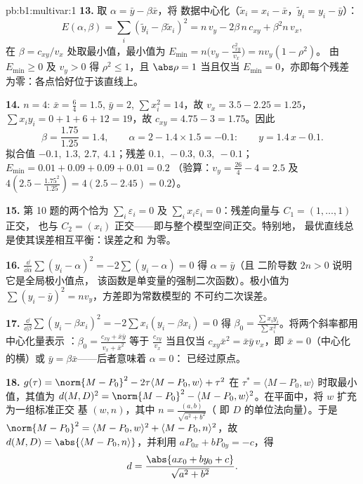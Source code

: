 \begin{solution}{pb:b1:multivar:1}
\textbf{13.} 取 $\alpha = \bar y - \beta\bar x$，将
数据中心化（$\tilde x_i = x_i - \bar x$，$\tilde y_i = y_i - \bar y$）：
\[
E(\alpha, \beta) = \sum_i(\tilde y_i - \beta\tilde x_i)^2
= n\,v_y - 2\beta\,n\,c_{xy} + \beta^2 n\,v_x ,
\]
在 $\beta = c_{xy}/v_x$ 处取最小值，最小值为 $E_{\min} =
n\bigl(v_y - \frac{c_{xy}^2}{v_x}\bigr) = n v_y(1 - \rho^2)$。
由 $E_{\min} \geq 0$ 及 $v_y > 0$ 得 $\rho^2 \leq 1$，且
$\abs\rho = 1$ 当且仅当 $E_{\min} = 0$，亦即每个残差
为零：各点恰好位于该直线上。

\textbf{14.} $n = 4$: $\bar x = \frac64 = 1.5$, $\bar y = 2$,
$\sum x_i^2 = 14$，故 $v_x = 3.5 - 2.25 = 1.25$，$\sum x_iy_i =
0 + 1 + 6 + 12 = 19$，故 $c_{xy} = 4.75 - 3 = 1.75$。因此
\[
\beta = \frac{1.75}{1.25} = 1.4,
\qquad
\alpha = 2 - 1.4\times1.5 = -0.1 :
\qquad y = 1.4\,x - 0.1 .
\]
拟合值 $-0.1,\ 1.3,\ 2.7,\ 4.1$；残差 $0.1,\ -0.3,\
0.3,\ -0.1$；$E_{\min} = 0.01 + 0.09 + 0.09 + 0.01 = 0.2$
（验算：$v_y = \frac{26}4 - 4 = 2.5$ 及 $4(2.5 -
\frac{1.75^2}{1.25}) = 4(2.5 - 2.45) = 0.2$）。

\textbf{15.} 第 10 题的两个恰为
$\sum_i\varepsilon_i = 0$ 及 $\sum_i x_i\varepsilon_i =
0$：残差向量与 $C_1 = (1, \dots, 1)$ 正交，
也与 $C_2 = (x_i)$ 正交——即与整个模型空间正交。特别地，
最优直线总是使其误差相互平衡：误差之和
为零。

\textbf{16.} $\frac{\dd}{\dd\alpha}\sum(y_i - \alpha)^2 =
-2\sum(y_i - \alpha) = 0$ 得 $\alpha = \bar y$（且
二阶导数 $2n > 0$ 说明它是全局极小值点，
该函数是单变量的强制二次函数）。极小值为
$\sum(y_i - \bar y)^2 = n v_y$，方差即为常数模型的
不可约二次误差。

\textbf{17.} $\frac{\dd}{\dd\beta}\sum(y_i - \beta x_i)^2 =
-2\sum x_i(y_i - \beta x_i) = 0$ 得 $\beta_0 = \frac{\sum
x_iy_i}{\sum x_i^2}$。将两个斜率都用中心化量表示
：$\beta_0 = \frac{c_{xy} + \bar x\bar y}{v_x + \bar
x^2}$ 等于 $\frac{c_{xy}}{v_x}$ 当且仅当 $c_{xy}\bar x^2 = \bar
x\bar y\,v_x$，即 $\bar x = 0$（中心化的横）或
$\bar y = \beta\bar x$——后者意味着 $\alpha = 0$：
已经过原点。

\textbf{18.} $g(\tau) = \norm{M - P_0}^2 - 2\tau\langle M - P_0,
w\rangle + \tau^2$ 在 $\tau^* = \langle M - P_0,
w\rangle$ 时取最小值，其值为 $d(M,D)^2 = \norm{M - P_0}^2 - \langle M -
P_0, w\rangle^2$。在平面中，将 $w$ 扩充为一组标准正交
基 $(w, n)$，其中 $n = \frac{(a, b)}{\sqrt{a^2+b^2}}$（
即 $D$ 的单位法向量）。于是 $\norm{M - P_0}^2 = \langle M - P_0,
w\rangle^2 + \langle M - P_0, n\rangle^2$，故 $d(M, D) =
\abs{\langle M - P_0, n\rangle}$，并利用 $aP_{0x} + bP_{0y} =
-c$，得
\[
d = \frac{\abs{a x_0 + b y_0 + c}}{\sqrt{a^2 + b^2}} .
\]


\end{solution}
